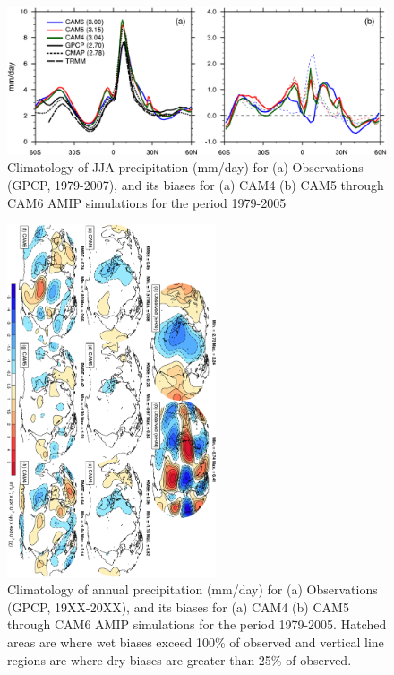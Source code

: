 \clearpage
\begin{figure}[t]
  \begin{center}
    \includegraphics[width=1.\textwidth,angle=0.]{./figs/f_PRECT_1D_JJA_CAM456.pdf}
  \end{center}
  \caption{Climatology of JJA precipitation (mm/day) for (a) Observations (GPCP, 1979-2007), and its biases for (a) CAM4 (b) CAM5  through CAM6 AMIP simulations for the period 1979-2005} 
\label{f_PRECT_1D_JJA_CAM456}
\end{figure} 


\clearpage
\begin{figure}[t]
  \begin{center}
    \includegraphics[width=0.55\textwidth,angle=90.]{./figs/f_PSICHI_2D_DJF_CAM456_diff.pdf}
  \end{center}
  \caption{Climatology of annual precipitation (mm/day) for (a) Observations (GPCP, 19XX-20XX), and its biases for (a) CAM4 (b) CAM5  through CAM6 AMIP simulations for the period 1979-2005. Hatched areas are where wet biases exceed 100\% of observed and vertical line regions are where dry biases are greater than 25\% of observed.}
\label{f_PSICHI_2D_DJF_CAM456_diff}
\end{figure}

